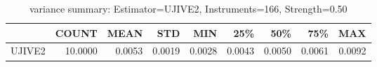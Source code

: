 \begin{table}[ht]
\centering
\caption{variance summary: Estimator=UJIVE2, Instruments=166, Strength=0.50}
\begin{tabular}{lrrrrrrrr}
\toprule
 & COUNT & MEAN & STD & MIN & 25\% & 50\% & 75\% & MAX \\
\midrule
UJIVE2 & 10.0000 & 0.0053 & 0.0019 & 0.0028 & 0.0043 & 0.0050 & 0.0061 & 0.0092 \\
\bottomrule
\end{tabular}
\end{table}
